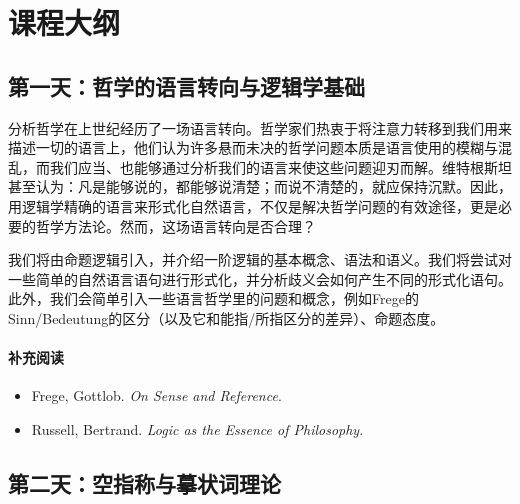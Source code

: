 \documentclass{article}
\begin{document}
\newpage
\section*{课程大纲}

\subsection*{第一天：哲学的语言转向与逻辑学基础}

分析哲学在上世纪经历了一场语言转向。哲学家们热衷于将注意力转移到我们用来描述一切的语言上，他们认为许多悬而未决的哲学问题本质是语言使用的模糊与混乱，而我们应当、也能够通过分析我们的语言来使这些问题迎刃而解。维特根斯坦甚至认为：凡是能够说的，都能够说清楚；而说不清楚的，就应保持沉默。因此，用逻辑学精确的语言来形式化自然语言，不仅是解决哲学问题的有效途径，更是必要的哲学方法论。然而，这场语言转向是否合理？

我们将由命题逻辑引入，并介绍一阶逻辑的基本概念、语法和语义。我们将尝试对一些简单的自然语言语句进行形式化，并分析歧义会如何产生不同的形式化语句。此外，我们会简单引入一些语言哲学里的问题和概念，例如Frege的Sinn/Bedeutung的区分（以及它和能指/所指区分的差异）、命题态度。

\paragraph*{补充阅读}
\begin{itemize}
  \item Frege, Gottlob. \textit{On Sense and Reference}.
  \item Russell, Bertrand. \textit{Logic as the Essence of Philosophy}.
\end{itemize}



\subsection*{第二天：空指称与摹状词理论}
\end{document}
